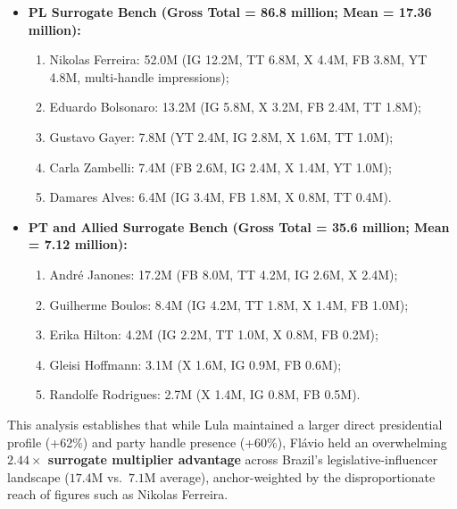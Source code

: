 \begin{enumerate}
    \begin{itemize}
        \item \textbf{PL Surrogate Bench (Gross Total = 86.8 million; Mean = 17.36 million):}
        \begin{enumerate}
            \item Nikolas Ferreira: 52.0M (IG 12.2M, TT 6.8M, X 4.4M, FB 3.8M, YT 4.8M, multi-handle impressions);
            \item Eduardo Bolsonaro: 13.2M (IG 5.8M, X 3.2M, FB 2.4M, TT 1.8M);
            \item Gustavo Gayer: 7.8M (YT 2.4M, IG 2.8M, X 1.6M, TT 1.0M);
            \item Carla Zambelli: 7.4M (FB 2.6M, IG 2.4M, X 1.4M, YT 1.0M);
            \item Damares Alves: 6.4M (IG 3.4M, FB 1.8M, X 0.8M, TT 0.4M).
        \end{enumerate}
        \item \textbf{PT and Allied Surrogate Bench (Gross Total = 35.6 million; Mean = 7.12 million):}
        \begin{enumerate}
            \item Andr{\'e} Janones: 17.2M (FB 8.0M, TT 4.2M, IG 2.6M, X 2.4M);
            \item Guilherme Boulos: 8.4M (IG 4.2M, TT 1.8M, X 1.4M, FB 1.0M);
            \item Erika Hilton: 4.2M (IG 2.2M, TT 1.0M, X 0.8M, FB 0.2M);
            \item Gleisi Hoffmann: 3.1M (X 1.6M, IG 0.9M, FB 0.6M);
            \item Randolfe Rodrigues: 2.7M (X 1.4M, IG 0.8M, FB 0.5M).
        \end{enumerate}
    \end{itemize}
    This analysis establishes that while Lula maintained a larger direct presidential profile (+62\%) and party handle presence (+60\%), Fl{\'a}vio held an overwhelming \textbf{$2.44\times$ surrogate multiplier advantage} across Brazil's legislative-influencer landscape ($17.4\text{M}$ vs.\ $7.1\text{M}$ average), anchor-weighted by the disproportionate reach of figures such as Nikolas Ferreira.
\end{enumerate}
